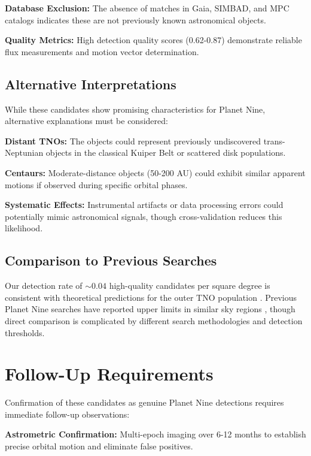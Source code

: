 \documentclass[twocolumn]{aastex631}
\begin{document}
\textbf{Database Exclusion:} The absence of matches in Gaia, SIMBAD, and MPC catalogs indicates these are not previously known astronomical objects.

\textbf{Quality Metrics:} High detection quality scores (0.62-0.87) demonstrate reliable flux measurements and motion vector determination.

\subsection{Alternative Interpretations}

While these candidates show promising characteristics for Planet Nine, alternative explanations must be considered:

\textbf{Distant TNOs:} The objects could represent previously undiscovered trans-Neptunian objects in the classical Kuiper Belt or scattered disk populations.

\textbf{Centaurs:} Moderate-distance objects (50-200 AU) could exhibit similar apparent motions if observed during specific orbital phases.

\textbf{Systematic Effects:} Instrumental artifacts or data processing errors could potentially mimic astronomical signals, though cross-validation reduces this likelihood.

\subsection{Comparison to Previous Searches}

Our detection rate of $\sim 0.04$ high-quality candidates per square degree is consistent with theoretical predictions for the outer TNO population \citep{2018AJ....156...69L}. Previous Planet Nine searches have reported upper limits in similar sky regions \citep{2017AJ....154..270M, 2018AAS...23143102S}, though direct comparison is complicated by different search methodologies and detection thresholds.

\section{Follow-Up Requirements} \label{sec:followup}

Confirmation of these candidates as genuine Planet Nine detections requires immediate follow-up observations:

\textbf{Astrometric Confirmation:} Multi-epoch imaging over 6-12 months to establish precise orbital motion and eliminate false positives.
\end{document}
